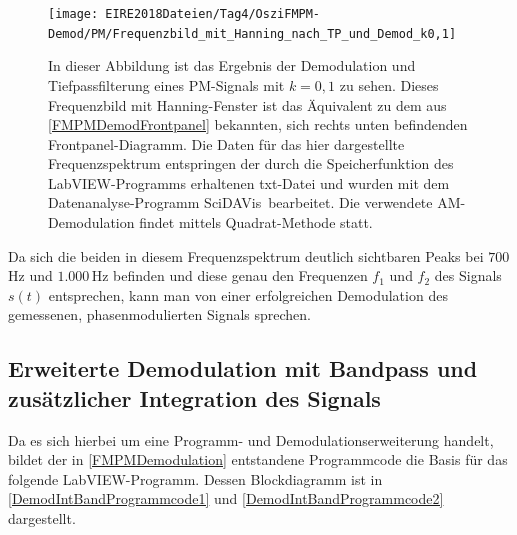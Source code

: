 \documentclass[
a4paper,
12pt,
pagesize,
ngerman
]{scrartcl}
\begin{document}
	\begin{figure}[H] %
		\centering
		\texttt{[image: EIRE2018Dateien/Tag4/OsziFMPM-Demod/PM/Frequenzbild\_mit\_Hanning\_nach\_TP\_und\_Demod\_k0,1]}
		\caption{In dieser Abbildung ist das Ergebnis der Demodulation und Tiefpassfilterung eines PM-Signals mit $k=0,1$ zu sehen. Dieses Frequenzbild mit Hanning-Fenster ist das Äquivalent zu dem aus \cref{FMPMDemodFrontpanel} bekannten, sich rechts unten befindenden Frontpanel-Diagramm. Die Daten für das hier dargestellte Frequenzspektrum entspringen der durch die Speicherfunktion des LabVIEW-Programms erhaltenen txt-Datei und wurden mit dem Datenanalyse-Programm \glqq SciDAVis\grqq\ bearbeitet. Die verwendete AM-Demodulation findet mittels \glqq Quadrat\grqq -Methode statt.}
		\label{PMDiagramm}
	\end{figure}
	
	\noindent Da sich die beiden in diesem Frequenzspektrum deutlich sichtbaren Peaks bei $700\,$Hz und $1.000\,$Hz befinden und diese genau den Frequenzen $f_1$ und $f_2$ des Signals $s(t)$ entsprechen, kann man von einer erfolgreichen Demodulation des gemessenen, phasenmodulierten Signals sprechen.
	
	
	
	
	\subsection{Erweiterte Demodulation mit Bandpass und zusätzlicher Integration des Signals} %
	
	Da es sich hierbei um eine Programm- und Demodulationserweiterung handelt, bildet der in \cref{FMPMDemodulation} entstandene Programmcode die Basis für das folgende LabVIEW-Programm.
	Dessen Blockdiagramm ist in \cref{DemodIntBandProgrammcode1} und \cref{DemodIntBandProgrammcode2} dargestellt.
	
\end{document}
